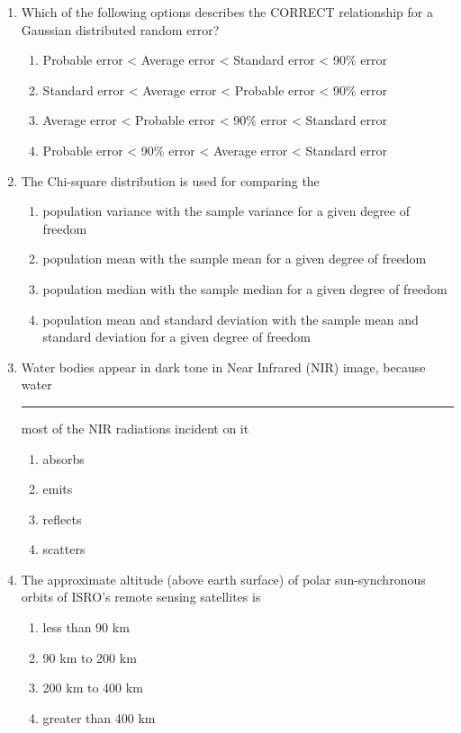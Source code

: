 \documentclass[12pt]{article}
\begin{document}
\begin{enumerate}
\item Which of the following options describes the CORRECT relationship for a
Gaussian distributed random error? 
\begin{enumerate}
    \item Probable error < Average error < Standard error < 90\% error 
   \item Standard error < Average error < Probable error < 90\% error  
   \item Average error < Probable error < 90\% error < Standard error 
   \item Probable error < 90\% error < Average error < Standard error  
\end{enumerate}

\item The Chi-square distribution is used for comparing the

\begin{enumerate}
    \item population variance with the sample variance for a given degree of freedom 
   \item population mean with the sample mean for a given degree of freedom 
   \item population median with the sample median for a given degree of freedom  
   \item population mean and standard deviation with the sample mean and standard
deviation for a given degree of freedom

\end{enumerate}

\item Water bodies appear in dark tone in Near Infrared (NIR) image, because water
\rule{2cm}{0.15mm} most of the NIR radiations incident on it

\begin{enumerate}
    \item absorbs 
   \item emits  
   \item reflects 
   \item scatters
\end{enumerate}

\item The approximate altitude (above earth surface) of polar sun-synchronous orbits of
ISRO’s remote sensing satellites is

\begin{enumerate}
    \item  less than 90 km 
   \item 90 km to 200 km 
   \item 200 km to 400 km  
   \item  greater than 400 km  
\end{enumerate}


\end{enumerate}
\end{document}
